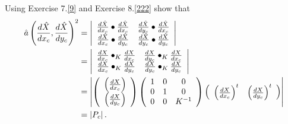 \documentclass{ximera}
\begin{document}
\begin{exercise}
Using Exercise 7.\ref{9} and Exercise 8.\ref{222} show that%
\begin{align*}
\hat{a}\left(  \frac{d\hat{X}}{dx_{c}},\frac{d\hat{X}}{dy_{c}}\right)  ^{2}
&  =\left\vert
\begin{array}
[c]{cc}%
\frac{d\hat{X}}{dx_{c}}\bullet\frac{d\hat{X}}{dx_{c}} & \frac{d\hat{X}}%
{dy_{c}}\bullet\frac{d\hat{X}}{dx_{c}}\\
\frac{d\hat{X}}{dx_{c}}\bullet\frac{d\hat{X}}{dy_{c}} & \frac{d\hat{X}}%
{dy_{c}}\bullet\frac{d\hat{X}}{dy_{c}}%
\end{array}
\right\vert \\
&  =\left\vert
\begin{array}
[c]{cc}%
\frac{dX}{dx_{c}}\bullet_{K}\frac{dX}{dx_{c}} & \frac{dX}{dy_{c}}\bullet
_{K}\frac{dX}{dx_{c}}\\
\frac{dX}{dx_{c}}\bullet_{K}\frac{dX}{dy_{c}} & \frac{dX}{dy_{c}}\bullet
_{K}\frac{dX}{dy_{c}}%
\end{array}
\right\vert \\
&  =\left\vert \left(
\begin{array}
[c]{c}%
\left(  \frac{dX}{dx_{c}}\right) \\
\left(  \frac{dX}{dy_{c}}\right)
\end{array}
\right)  \left(
\begin{array}
[c]{ccc}%
1 & 0 & 0\\
0 & 1 & 0\\
0 & 0 & K^{-1}%
\end{array}
\right)  \left(
\begin{array}
[c]{cc}%
\left(  \frac{dX}{dx_{c}}\right)  ^{t} & \left(  \frac{dX}{dy_{c}}\right)
^{t}%
\end{array}
\right)  \right\vert \\
&  =\left\vert P_{c}\right\vert .
\end{align*}

\end{exercise}
\end{document}
